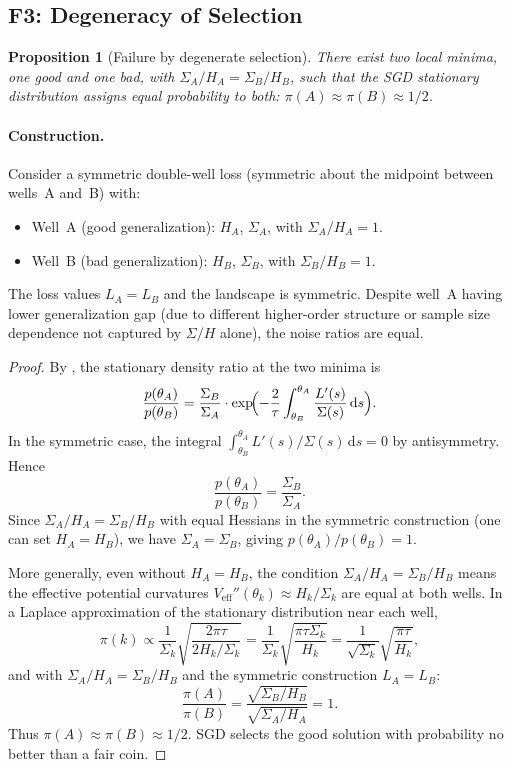 \documentclass[11pt,a4paper]{article}
\newtheorem{proposition}[theorem]{Proposition}
\newcommand{\dif}{\,\mathrm{d}}
\newcommand{\Veff}{V_{\mathrm{eff}}}
\begin{document}
\subsection{F3: Degeneracy of Selection}
\label{sec:f3}

\begin{proposition}[Failure by degenerate selection]
\label{prop:f3}
There exist two local minima, one good and one bad, with
$\Sigma_A/H_A = \Sigma_B/H_B$, such that the SGD stationary distribution
assigns equal probability to both: $\pi(A)\approx \pi(B) \approx 1/2$.
\end{proposition}

\paragraph{Construction.}
Consider a symmetric double-well loss (symmetric about the midpoint between
wells~A and~B) with:
\begin{itemize}[nosep]
  \item Well~A (good generalization): $H_A$, $\Sigma_A$, with
        $\Sigma_A / H_A = 1$.
  \item Well~B (bad generalization): $H_B$, $\Sigma_B$, with
        $\Sigma_B / H_B = 1$.
\end{itemize}
The loss values $L_A = L_B$ and the landscape is symmetric.  Despite well~A
having lower generalization gap (due to different higher-order structure or
sample size dependence not captured by $\Sigma/H$ alone), the noise ratios
are equal.

\begin{proof}
By , the stationary density ratio at the two minima is
\[
  \frac{p(\theta_A)}{p(\theta_B)}
  = \frac{\Sigma_B}{\Sigma_A}
    \cdot\exp\!\Bigl(-\frac{2}{\tau}\int_{\theta_B}^{\theta_A}
      \frac{L'(s)}{\Sigma(s)}\dif s\Bigr).
\]
In the symmetric case, the integral $\int_{\theta_B}^{\theta_A}
L'(s)/\Sigma(s)\dif s = 0$ by antisymmetry.  Hence
\[
  \frac{p(\theta_A)}{p(\theta_B)} = \frac{\Sigma_B}{\Sigma_A}.
\]
Since $\Sigma_A/H_A = \Sigma_B/H_B$ with equal Hessians in the symmetric
construction (one can set $H_A = H_B$), we have $\Sigma_A = \Sigma_B$, giving
$p(\theta_A)/p(\theta_B) = 1$.

More generally, even without $H_A = H_B$, the condition $\Sigma_A/H_A =
\Sigma_B/H_B$ means the effective potential curvatures
$\Veff''(\theta_k) \approx H_k/\Sigma_k$ are equal at both wells.  In a
Laplace approximation of the stationary distribution near each well,
\[
  \pi(k) \propto \frac{1}{\Sigma_k}\sqrt{\frac{2\pi\tau}{2H_k/\Sigma_k}}
  = \frac{1}{\Sigma_k}\sqrt{\frac{\pi\tau\Sigma_k}{H_k}}
  = \frac{1}{\sqrt{\Sigma_k}}\sqrt{\frac{\pi\tau}{H_k}},
\]
and with $\Sigma_A/H_A = \Sigma_B/H_B$ and the symmetric construction
$L_A = L_B$:
\[
  \frac{\pi(A)}{\pi(B)}
  = \frac{\sqrt{\Sigma_B/H_B}}{\sqrt{\Sigma_A/H_A}} = 1.
\]
Thus $\pi(A) \approx \pi(B) \approx 1/2$.  SGD selects the good solution
with probability no better than a fair coin.
\end{proof}
\end{document}
